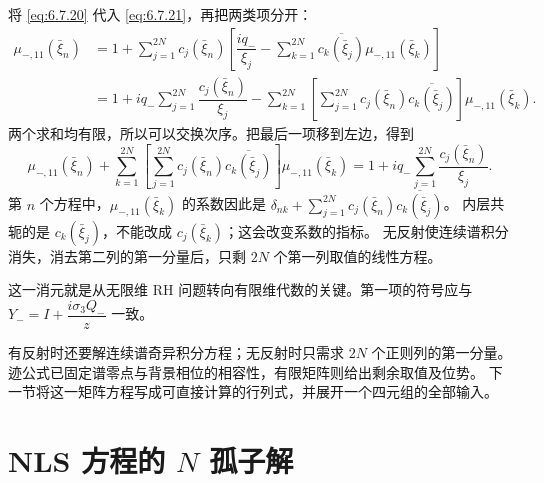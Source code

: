 \documentclass[lang=cn,scheme=chinese,mode=simple,device=normal,color=blue,
math=cm,thmcnt=section,12pt]{elegantbook}
\newcommand{\conj}[1]{\overline{#1}}
\begin{document}
\begin{callout}[计算：消元的每个矩阵指标]
    将 \eqref{eq:6.7.20} 代入 \eqref{eq:6.7.21}，再把两类项分开：
    \[
        \begin{aligned}
            \mu_{-,11}(\bar\xi_n)
             & =1+\sum\limits_{j=1}^{2N}c_j(\bar\xi_n)
            \left[\dfrac{iq_-}{\xi_j}-\sum\limits_{k=1}^{2N}\conj{c_k(\bar\xi_j)}\mu_{-,11}(\bar\xi_k)\right] \\
             & =1+iq_-\sum\limits_{j=1}^{2N}\dfrac{c_j(\bar\xi_n)}{\xi_j}
            -\sum\limits_{k=1}^{2N}\left[\sum\limits_{j=1}^{2N}c_j(\bar\xi_n)\conj{c_k(\bar\xi_j)}\right]\mu_{-,11}(\bar\xi_k).
        \end{aligned}
    \]
    两个求和均有限，所以可以交换次序。把最后一项移到左边，得到
    \[
        \mu_{-,11}(\bar\xi_n)+\sum\limits_{k=1}^{2N}
        \left[\sum\limits_{j=1}^{2N}c_j(\bar\xi_n)\conj{c_k(\bar\xi_j)}\right]\mu_{-,11}(\bar\xi_k)
        =1+iq_-\sum\limits_{j=1}^{2N}\dfrac{c_j(\bar\xi_n)}{\xi_j}.
    \]
    第 $n$ 个方程中，$\mu_{-,11}(\bar\xi_k)$ 的系数因此是
    $\delta_{nk}+\displaystyle\sum\limits_{j=1}^{2N}c_j(\bar\xi_n)\conj{c_k(\bar\xi_j)}$。
    内层共轭的是 $c_k(\bar\xi_j)$，不能改成 $c_j(\bar\xi_k)$；这会改变系数的指标。
    无反射使连续谱积分消失，消去第二列的第一分量后，只剩 $2N$ 个第一列取值的线性方程。
\end{callout}


这一消元就是从无限维 RH 问题转向有限维代数的关键。第一项的符号应与 $Y_-=I+\dfrac{i\sigma_3Q_-}{z}$ 一致。


\begin{callout}
    有反射时还要解连续谱奇异积分方程；无反射时只需求 $2N$ 个正则列的第一分量。
    迹公式已固定谱零点与背景相位的相容性，有限矩阵则给出剩余取值及位势。
    下一节将这一矩阵方程写成可直接计算的行列式，并展开一个四元组的全部输入。
\end{callout}

\section{NLS 方程的 \texorpdfstring{$N$}{N} 孤子解}
\end{document}
